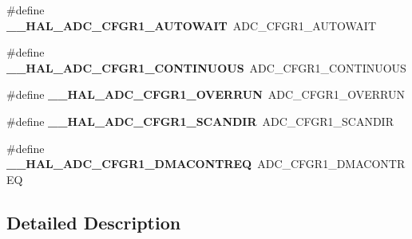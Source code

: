 \begin{DoxyCompactItemize}
\item 
\#define {\bfseries \+\_\+\+\_\+\+H\+A\+L\+\_\+\+A\+D\+C\+\_\+\+C\+F\+G\+R1\+\_\+\+A\+U\+T\+O\+W\+A\+IT}~A\+D\+C\+\_\+\+C\+F\+G\+R1\+\_\+\+A\+U\+T\+O\+W\+A\+IT\hypertarget{group___h_a_l___a_d_c___aliased___macros_ga400e3c69f55dad73669df7ce10297066}{}\label{group___h_a_l___a_d_c___aliased___macros_ga400e3c69f55dad73669df7ce10297066}

\item 
\#define {\bfseries \+\_\+\+\_\+\+H\+A\+L\+\_\+\+A\+D\+C\+\_\+\+C\+F\+G\+R1\+\_\+\+C\+O\+N\+T\+I\+N\+U\+O\+US}~A\+D\+C\+\_\+\+C\+F\+G\+R1\+\_\+\+C\+O\+N\+T\+I\+N\+U\+O\+US\hypertarget{group___h_a_l___a_d_c___aliased___macros_ga6e3bc5992840ed200085c9b3ba68d7d2}{}\label{group___h_a_l___a_d_c___aliased___macros_ga6e3bc5992840ed200085c9b3ba68d7d2}

\item 
\#define {\bfseries \+\_\+\+\_\+\+H\+A\+L\+\_\+\+A\+D\+C\+\_\+\+C\+F\+G\+R1\+\_\+\+O\+V\+E\+R\+R\+UN}~A\+D\+C\+\_\+\+C\+F\+G\+R1\+\_\+\+O\+V\+E\+R\+R\+UN\hypertarget{group___h_a_l___a_d_c___aliased___macros_ga60d5ad7e386833338f43e293120fd20a}{}\label{group___h_a_l___a_d_c___aliased___macros_ga60d5ad7e386833338f43e293120fd20a}

\item 
\#define {\bfseries \+\_\+\+\_\+\+H\+A\+L\+\_\+\+A\+D\+C\+\_\+\+C\+F\+G\+R1\+\_\+\+S\+C\+A\+N\+D\+IR}~A\+D\+C\+\_\+\+C\+F\+G\+R1\+\_\+\+S\+C\+A\+N\+D\+IR\hypertarget{group___h_a_l___a_d_c___aliased___macros_gacadf737dca92c21560405c914f98ab06}{}\label{group___h_a_l___a_d_c___aliased___macros_gacadf737dca92c21560405c914f98ab06}

\item 
\#define {\bfseries \+\_\+\+\_\+\+H\+A\+L\+\_\+\+A\+D\+C\+\_\+\+C\+F\+G\+R1\+\_\+\+D\+M\+A\+C\+O\+N\+T\+R\+EQ}~A\+D\+C\+\_\+\+C\+F\+G\+R1\+\_\+\+D\+M\+A\+C\+O\+N\+T\+R\+EQ\hypertarget{group___h_a_l___a_d_c___aliased___macros_gad36423da25741a685c5aefd3cd0d08ee}{}\label{group___h_a_l___a_d_c___aliased___macros_gad36423da25741a685c5aefd3cd0d08ee}

\end{DoxyCompactItemize}


\subsection{Detailed Description}
